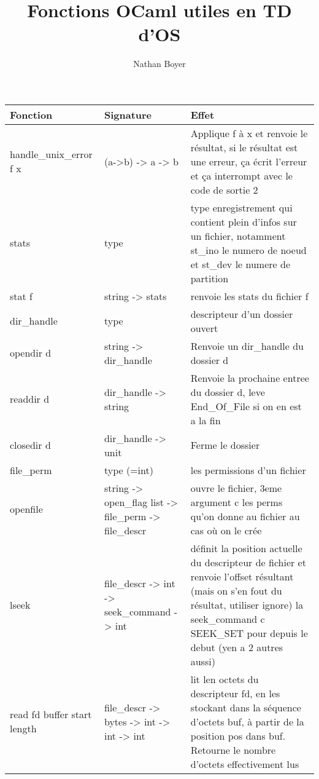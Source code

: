 \documentclass{article}
\title{Fonctions OCaml utiles en TD d'OS}
\author{Nathan Boyer}
\begin{document}
\maketitle

\begin{table}[htbp]
    \centering
    \begin{tabular}{|p{4cm}|p{3cm}|p{7cm}|} %
        \hline
        Fonction & Signature & Effet \\ 
        \hline 
        handle\_unix\_error f x & (a->b) -> a -> b & Applique f à x et renvoie le résultat, si le résultat est une erreur, ça écrit l'erreur et ça interrompt avec le code de sortie 2 \\ 
        \hline 
        stats & type & type enregistrement qui contient plein d'infos sur un fichier, notamment st\_ino le numero de noeud et st\_dev le numere de partition \\ 
        \hline 
        stat f & string -> stats & renvoie les stats du fichier f \\ 
        \hline 
        dir\_handle & type & descripteur d'un dossier ouvert \\ 
        \hline 
        opendir d & string -> dir\_handle & Renvoie un dir\_handle du dossier d \\ 
        \hline 
        readdir d & dir\_handle -> string & Renvoie la prochaine entree du dossier d, leve End\_Of\_File si on en est a la fin \\ 
        \hline 
        closedir d & dir\_handle -> unit & Ferme le dossier \\ 
        \hline 
        file\_perm & type (=int) & les permissions d'un fichier \\ 
        \hline 
        openfile & string -> open\_flag list -> file\_perm -> file\_descr & ouvre le fichier, 3eme argument c les perms qu'on donne au fichier au cas où on le crée \\ 
        \hline 
        lseek & file\_descr -> int -> seek\_command -> int & définit la position actuelle du descripteur de fichier et renvoie l'offset résultant (mais on s'en fout du résultat, utiliser ignore)
        la seek\_command c SEEK\_SET pour depuis le debut (yen a 2 autres aussi) \\ 
        \hline 
        read fd buffer start length & file\_descr -> bytes -> int -> int -> int & lit len octets du descripteur fd, en les stockant dans la séquence d'octets buf, à partir de la position pos dans buf. Retourne le nombre d'octets effectivement lus \\ 

\end{tabular}
\end{table}
\end{document}
